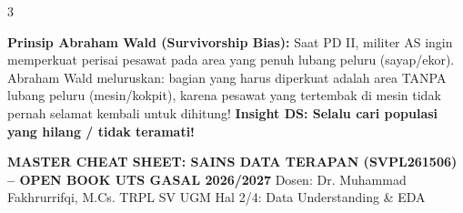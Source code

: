 \documentclass[6.8pt,landscape,a4paper]{extarticle}
\newcommand{\alertBox}[2][sdtRed]{%
    \begin{tcolorbox}[
        enhanced, frame hidden,
        borderline west={1.2pt}{0pt}{#1},
        colback=#1!5,
        top=0.2mm, bottom=0.2mm, left=0.8mm, right=0.5mm,
        before skip=0.25mm, after skip=0.25mm
    ]
        {\fontsize{5.2pt}{6.2pt}\selectfont#2}
    \end{tcolorbox}
}
\begin{document}
\begin{multicols}{3}
\alertBox[sdtNavy]{
\textbf{Prinsip Abraham Wald (Survivorship Bias):}
Saat PD II, militer AS ingin memperkuat perisai pesawat pada area yang penuh lubang peluru (sayap/ekor). Abraham Wald meluruskan: bagian yang harus diperkuat adalah area TANPA lubang peluru (mesin/kokpit), karena pesawat yang tertembak di mesin tidak pernah selamat kembali untuk dihitung! \textbf{Insight DS: Selalu cari populasi yang hilang / tidak teramati!}
}

\end{multicols}

\clearpage

\noindent\colorbox{sdtNavy}{%
    \parbox{\dimexpr\textwidth-2\fboxsep\relax}{%
        \color{white}%
        \textbf{\fontsize{7.8pt}{8.8pt}\selectfont MASTER CHEAT SHEET: SAINS DATA TERAPAN (SVPL261506) -- OPEN BOOK UTS GASAL 2026/2027}%
        \hfill%
        \fontsize{5.8pt}{6.8pt}\selectfont Dosen: Dr. Muhammad Fakhrurrifqi, M.Cs. \textbar{} TRPL SV UGM \textbar{} Hal 2/4: Data Understanding \& EDA%
    }%
}
\vspace{0.2mm}
\end{document}
